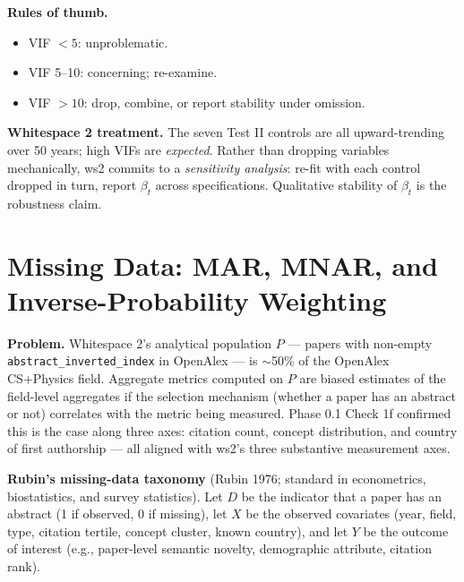\documentclass[11pt]{article}
\begin{document}
\textbf{Rules of thumb.}
\begin{itemize}[nosep]
  \item VIF $< 5$: unproblematic.
  \item VIF 5--10: concerning; re-examine.
  \item VIF $> 10$: drop, combine, or report stability under omission.
\end{itemize}

\textbf{Whitespace 2 treatment.} The seven Test II controls are all
upward-trending over 50 years; high VIFs are \textit{expected}. Rather
than dropping variables mechanically, ws2 commits to a
\textit{sensitivity analysis}: re-fit with each control dropped in turn,
report $\beta_t$ across specifications. Qualitative stability of
$\beta_t$ is the robustness claim.

\section{Missing Data: MAR, MNAR, and Inverse-Probability Weighting}
\label{sec:mar-mnar}

\textbf{Problem.} Whitespace 2's analytical population $P$ — papers
with non-empty \texttt{abstract\_inverted\_index} in OpenAlex — is
$\sim$50\% of the OpenAlex CS+Physics field. Aggregate metrics computed
on $P$ are biased estimates of the field-level aggregates if the
selection mechanism (whether a paper has an abstract or not) correlates
with the metric being measured. Phase 0.1 Check 1f confirmed this is the
case along three axes: citation count, concept distribution, and
country of first authorship — all aligned with ws2's three substantive
measurement axes.

\textbf{Rubin's missing-data taxonomy} (Rubin 1976; standard in
econometrics, biostatistics, and survey statistics). Let $D$ be the
indicator that a paper has an abstract (1 if observed, 0 if missing),
let $X$ be the observed covariates (year, field, type, citation tertile,
concept cluster, known country), and let $Y$ be the outcome of interest
(e.g., paper-level semantic novelty, demographic attribute, citation
rank).
\end{document}
